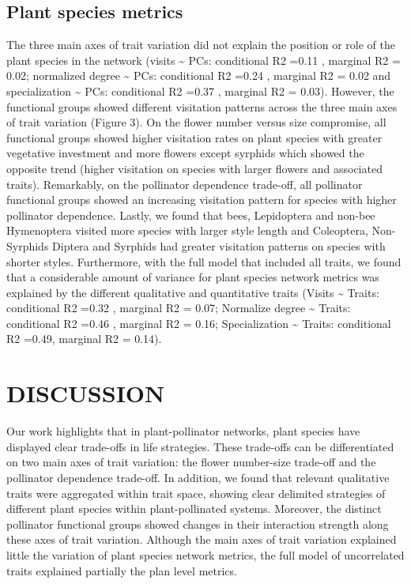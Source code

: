 \documentclass[11pt,a4paper,]{article}
\begin{document}
\subsection{Plant species metrics}\label{plant-species-metrics}

The three main axes of trait variation did not explain the position or
role of the plant species in the network (visits \textasciitilde{} PCs:
conditional R2 =0.11 , marginal R2 = 0.02; normalized degree
\textasciitilde{} PCs: conditional R2 =0.24 , marginal R2 = 0.02 and
specialization \textasciitilde{} PCs: conditional R2 =0.37 , marginal R2
= 0.03). However, the functional groups showed different visitation
patterns across the three main axes of trait variation (Figure 3). On
the flower number versus size compromise, all functional groups showed
higher visitation rates on plant species with greater vegetative
investment and more flowers except syrphids which showed the opposite
trend (higher visitation on species with larger flowers and associated
traits). Remarkably, on the pollinator dependence trade-off, all
pollinator functional groups showed an increasing visitation pattern for
species with higher pollinator dependence. Lastly, we found that bees,
Lepidoptera and non-bee Hymenoptera visited more species with larger
style length and Coleoptera, Non-Syrphids Diptera and Syrphids had
greater visitation patterns on species with shorter styles. Furthermore,
with the full model that included all traits, we found that a
considerable amount of variance for plant species network metrics was
explained by the different qualitative and quantitative traits (Visits
\textasciitilde{} Traits: conditional R2 =0.32 , marginal R2 = 0.07;
Normalize degree \textasciitilde{} Traits: conditional R2 =0.46 ,
marginal R2 = 0.16; Specialization \textasciitilde{} Traits: conditional
R2 =0.49, marginal R2 = 0.14).

\section{DISCUSSION}\label{discussion}

Our work highlights that in plant-pollinator networks, plant species
have displayed clear trade-offs in life strategies. These trade-offs can
be differentiated on two main axes of trait variation: the flower
number-size trade-off and the pollinator dependence trade-off. In
addition, we found that relevant qualitative traits were aggregated
within trait space, showing clear delimited strategies of different
plant species within plant-pollinated systems. Moreover, the distinct
pollinator functional groups showed changes in their interaction
strength along these axes of trait variation. Although the main axes of
trait variation explained little the variation of plant species network
metrics, the full model of uncorrelated traits explained partially the
plan level metrics.
\end{document}
